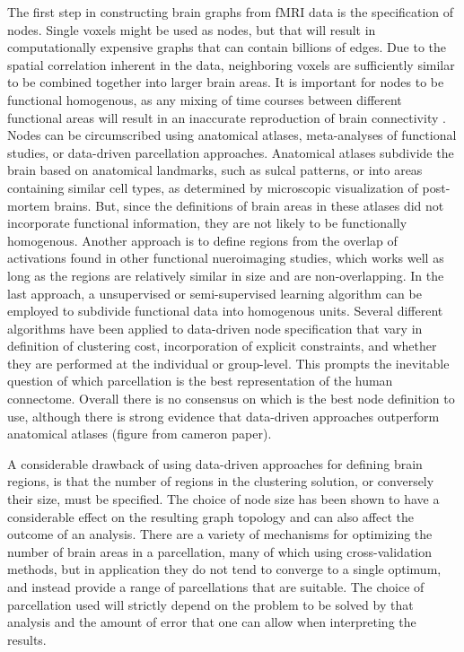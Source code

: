 The first step in constructing brain graphs from fMRI data is the specification of nodes. Single voxels might be used as nodes, but that will result in computationally expensive graphs that can contain billions of edges. Due to the spatial correlation inherent in the data, neighboring voxels are sufficiently similar to be combined together into larger brain areas. It is important for nodes to be functional homogenous, as any mixing of time courses between different functional areas will result in an inaccurate reproduction of brain connectivity \cite{smith2010}. Nodes can be circumscribed using anatomical atlases, meta-analyses of functional studies, or data-driven parcellation approaches. Anatomical atlases subdivide the brain based on anatomical landmarks\cite{AAL, HO}, such as sulcal patterns\cite{varoquaux}, or into areas containing similar cell types, as determined by microscopic visualization of post-mortem brains\cite{TT,Eickhoffzilles}. But, since the definitions of brain areas in these atlases did not incorporate functional information, they are not likely to be functionally homogenous. Another approach is to define regions from the overlap of activations found in other functional nueroimaging studies\cite{Dosenbach}, which works well as long as the regions are relatively similar in size and are non-overlapping\cite{VaroquauxCraddock2013}. In the last approach, a unsupervised or semi-supervised learning algorithm can be employed to subdivide functional data into homogenous units. Several different algorithms have been applied to data-driven node specification that vary in definition of clustering cost, incorporation of explicit constraints, and whether they are performed at the individual or group-level\cite{bellec, flandin, craddock, blumensath, kiviniemi}. This prompts the inevitable question of which parcellation is the best representation of the human connectome. Overall there is no consensus on which is the best node definition to use, although there is strong evidence that data-driven approaches outperform anatomical atlases (figure from cameron paper).

A considerable drawback of using data-driven approaches for defining brain regions, is that the number of regions in the clustering solution, or conversely their size, must be specified. The choice of node size has been shown to have a considerable effect on the resulting graph topology \cite{Zalesky} and can also affect the outcome of an analysis\cite{Cecci_2009}. There are a variety of mechanisms for optimizing the number of brain areas in a parcellation, many of which using cross-validation methods, but in application they do not tend to converge to a single optimum, and instead provide a range of parcellations that are suitable\cite{craddock2012}. The choice of parcellation used will strictly depend on the problem to be solved by that analysis and the amount of error that one can allow when interpreting the results. 

